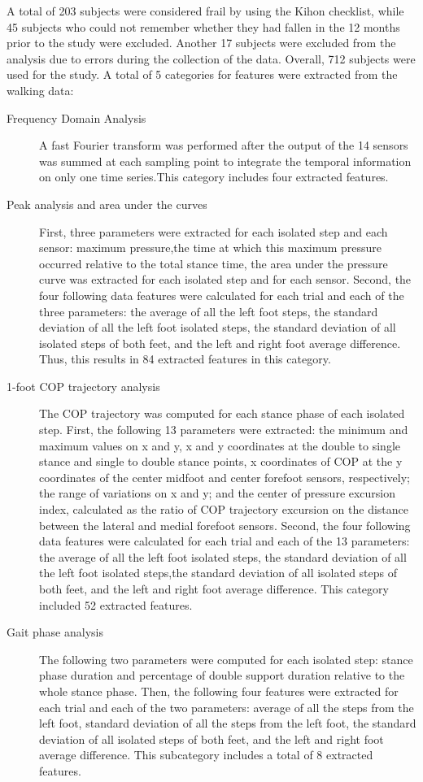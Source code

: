 A total of 203 subjects were considered frail by using the Kihon checklist, while 45 subjects who could not remember whether they had fallen in the 12 months prior to the study were excluded. Another 17 subjects were excluded from the analysis due to errors during the collection of the data. Overall, 712 subjects were used for the study. 
A total of 5 categories for features were extracted from the walking data:
\begin{description}
    \item[Frequency Domain Analysis] A fast Fourier transform was performed after the output of the 14 sensors was summed at each sampling point to integrate the temporal information on only one time series.This category includes four extracted features.
    \item[Peak analysis and area under the curves] First, three parameters were extracted for each isolated step and each sensor: maximum pressure,the time at which this maximum pressure occurred relative to the total stance time, the area under the pressure curve was extracted for each isolated step and for each sensor. Second, the four following data features were calculated for each trial and each of the three parameters: the average of all the left foot steps, the standard deviation of all the left foot isolated steps, the standard deviation of all isolated steps of both feet, and the left and right foot average difference. Thus, this results in 84 extracted features in this category.
    \item[1-foot COP trajectory analysis] The COP trajectory was computed for each stance phase of each isolated step. First, the following 13 parameters were extracted: the minimum and maximum values on x and y, x and y coordinates at the double to single stance and single to double stance points, x coordinates of COP at the y coordinates of the center midfoot and center forefoot sensors, respectively; the range of variations on x and y; and the center of pressure excursion index, calculated as the ratio of COP trajectory excursion on the distance between the lateral and medial forefoot sensors. Second, the four following data features were calculated for each trial and each of the 13 parameters: the average of all the left foot isolated steps, the standard deviation of all the left foot isolated steps,the standard deviation of all isolated steps of both feet, and the left and right foot average difference. This category included 52 extracted features.
    \item[Gait phase analysis] The following two parameters were computed for each isolated step: stance phase duration and percentage of double support duration relative to the whole stance phase. Then, the following four features were extracted for each trial and each of the two parameters: average of all the steps from the left foot, standard deviation of all the steps from the left foot, the standard deviation of all isolated steps of both feet, and the left and right foot average difference. This subcategory includes a total of 8 extracted features.

\end{description}

